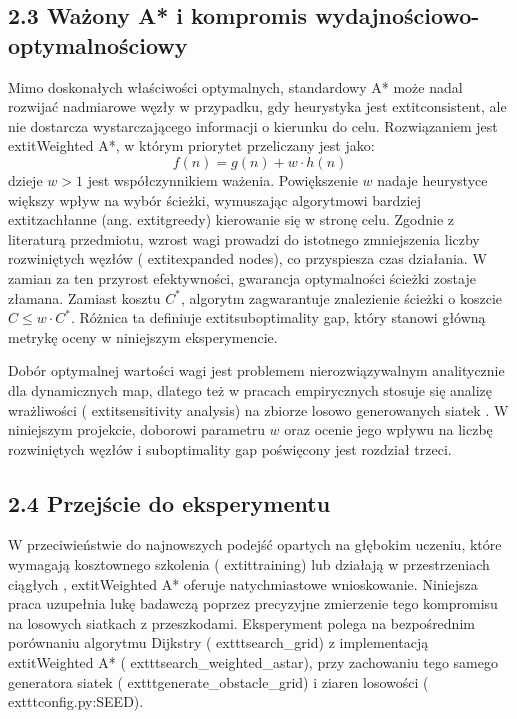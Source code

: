 \documentclass[conference]{IEEEtran}
\begin{document}
\subsection{2.3 Ważony A* i kompromis wydajnościowo-optymalnościowy}
Mimo doskonałych właściwości optymalnych, standardowy A* może nadal rozwijać nadmiarowe węzły w przypadku, gdy heurystyka jest  extit{consistent}, ale nie dostarcza wystarczającego informacji o kierunku do celu. Rozwiązaniem jest  extit{Weighted A*}, w którym priorytet przeliczany jest jako:
\begin{equation}
    f(n) = g(n) + w \cdot h(n)
\end{equation}
dzieje $w > 1$ jest współczynnikiem ważenia. Powiększenie $w$ nadaje heurystyce większy wpływ na wybór ścieżki, wymuszając algorytmowi bardziej  extit{zachłanne} (ang.  extit{greedy}) kierowanie się w stronę celu. Zgodnie z literaturą przedmiotu, wzrost wagi prowadzi do istotnego zmniejszenia liczby rozwiniętych węzłów ( extit{expanded nodes}), co przyspiesza czas działania\cite{abbasov2025optimal}. W zamian za ten przyrost efektywności, gwarancja optymalności ścieżki zostaje złamana. Zamiast kosztu $C^*$, algorytm zagwarantuje znalezienie ścieżki o koszcie $C \le w \cdot C^*$. Różnica ta definiuje  extit{suboptimality gap}, który stanowi główną metrykę oceny w niniejszym eksperymencie.

Dobór optymalnej wartości wagi jest problemem nierozwiązywalnym analitycznie dla dynamicznych map, dlatego też w pracach empirycznych stosuje się analizę wrażliwości ( extit{sensitivity analysis}) na zbiorze losowo generowanych siatek \cite{bokan2024slope}. W niniejszym projekcie, doborowi parametru $w$ oraz ocenie jego wpływu na liczbę rozwiniętych węzłów i suboptimality gap poświęcony jest rozdział trzeci.

\subsection{2.4 Przejście do eksperymentu}
W przeciwieństwie do najnowszych podejść opartych na głębokim uczeniu, które wymagają kosztownego szkolenia ( extit{training}) lub działają w przestrzeniach ciągłych \cite{zhao2026customizable},  extit{Weighted A*} oferuje natychmiastowe wnioskowanie. Niniejsza praca uzupełnia lukę badawczą poprzez precyzyjne zmierzenie tego kompromisu na losowych siatkach z przeszkodami. Eksperyment polega na bezpośrednim porównaniu algorytmu Dijkstry ( exttt{search\_grid}) z implementacją  extit{Weighted A*} ( exttt{search\_weighted\_astar}), przy zachowaniu tego samego generatora siatek ( exttt{generate\_obstacle\_grid}) i ziaren losowości ( exttt{config.py:SEED}).
\end{document}
